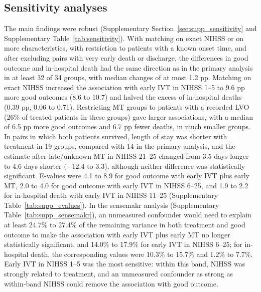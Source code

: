 \subsection{Sensitivity analyses}

The main findings were robust (Supplementary Section~\ref{sec:supp_sensitivity} and Supplementary Table~\ref{tab:sensitivity}). With matching on exact NIHSS or on more characteristics, with restriction to patients with a known onset time, and after excluding pairs with very early death or discharge, the differences in good outcome and in-hospital death had the same direction as in the primary analysis in at least 32 of 34 groups, with median changes of at most 1.2 pp. Matching on exact NIHSS increased the association with early IVT in NIHSS 1--5 to 9.6 pp more good outcomes (8.6 to 10.7) and halved the excess of in-hospital deaths (0.39 pp, 0.06 to 0.71). Restricting MT groups to patients with a recorded LVO (26\% of treated patients in these groups) gave larger associations, with a median of 6.5 pp more good outcomes and 6.7 pp fewer deaths, in much smaller groups. In pairs in which both patients survived, length of stay was shorter with treatment in 19 groups, compared with 14 in the primary analysis, and the estimate after late/unknown MT in NIHSS 21--25 changed from 3.5 days longer to 4.6 days shorter ($-$12.4 to 3.3), although neither difference was statistically significant. E-values were 4.1 to 8.9 for good outcome with early IVT plus early MT, 2.0 to 4.0 for good outcome with early IVT in NIHSS 6--25, and 1.9 to 2.2 for in-hospital death with early IVT in NIHSS 11--25 (Supplementary Table~\ref{tab:supp_evalues}). In the sensemakr analysis (Supplementary Table~\ref{tab:supp_sensemakr}), an unmeasured confounder would need to explain at least 24.7\% to 27.4\% of the remaining variance in both treatment and good outcome to make the association with early IVT plus early MT no longer statistically significant, and 14.0\% to 17.9\% for early IVT in NIHSS 6--25; for in-hospital death, the corresponding values were 10.3\% to 15.7\% and 1.2\% to 7.7\%. Early IVT in NIHSS 1--5 was the most sensitive: within this band, NIHSS was strongly related to treatment, and an unmeasured confounder as strong as within-band NIHSS could remove the association with good outcome.

